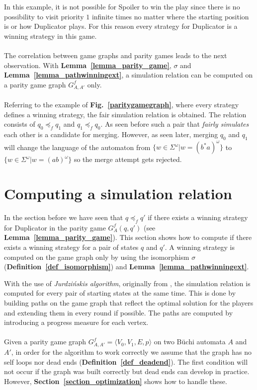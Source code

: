 \documentclass[12pt,oneside,bibliography=totoc,abstracton]{scrartcl}
\newcommand{\figref}[1]{\textbf{Fig.~\ref{#1}}}
\newcommand{\lemmaref}[1]{\textbf{Lemma~\ref{#1}}}
\newcommand{\sectionref}[1]{\textbf{Section~\ref{#1}}}
\newcommand{\defref}[1]{\textbf{Definition~\ref{#1}}}
\newcommand{\libref}[1]{\textbf{\cite{#1}}}
\begin{document}
In this example, it is not possible for Spoiler to win the play since there is no
possibility to visit priority $1$ infinite times no matter where the starting position is or how Duplicator plays.
For this reason every strategy for Duplicator is a winning strategy in this game.\\\\
The correlation between game graphs and parity games leads to the next observation.
With \lemmaref{lemma_parity_game}, $\sigma$ and \lemmaref{lemma_pathwinningext}, a simulation
relation can be computed on a parity game graph $G^f_{A, A'}$ only.\\\\
Referring to the example of \figref{paritygamegraph}, where every strategy defines a winning strategy,
the fair simulation relation is obtained. The relation consists of $q_0 \preceq_f q_1$ and $q_1 \preceq_f q_0$.
As seen before such a pair that \textit{fairly simulates} each other is a candidate for merging.
However, as seen later, merging $q_0$ and $q_1$ will change the language of the
automaton from $\{w \in \Sigma^{\omega} | w = (b^*a)^{\omega}\}$ to
$\{w \in \Sigma^{\omega} | w = (ab)^{\omega}\}$ so the merge attempt gets rejected.

\section{Computing a simulation relation}
In the section before we have seen that $q \preceq_f q'$ if there exists a winning strategy for Duplicator
in the parity game $G^f_A(q, q')$ (see \lemmaref{lemma_parity_game}).
This section shows how to compute if there exists a winning strategy for a pair of states $q$ and $q'$.
A winning strategy is computed on the game graph only by using the isomorphism
$\sigma$ (\defref{def_isomorphism}) and \lemmaref{lemma_pathwinningext}.

With the use of \textit{Jurdzi\'nskis algorithm}, originally from \libref{jurdz_original}, the simulation
relation is computed for every pair of starting states at the same time. This is done by building paths on the game graph
that reflect the optimal solution for the players and extending them in every round if possible.
The paths are computed by introducing a progress measure for each vertex.\\\\
Given a parity game graph $G^f_{A, A'} = \langle V_0, V_1, E, p\rangle$ on two Büchi automata $A$ and $A'$,
in order for the algorithm to work correctly we assume that the graph has no self loops nor dead ends (\defref{def_deadend}).
The first condition will not occur if the graph was built correctly but dead ends can develop in practice.
However, \sectionref{section_optimization} shows how to handle these.
\end{document}
